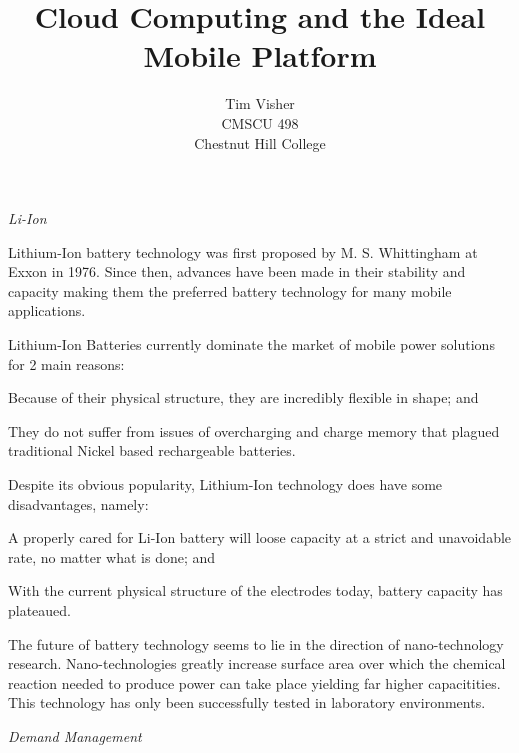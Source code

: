 \documentclass[letterpaper]{article}
\author{Tim Visher\\ CMSCU 498\\ Chestnut Hill College}
\title{Cloud Computing and the Ideal Mobile Platform}
\begin{document}
\Huge{

  \begin{center}
    \emph{Li-Ion}
  \end{center}}

\huge{

  Lithium-Ion battery technology was first proposed by M. S. Whittingham at
  Exxon in 1976.  Since then, advances have been made in their stability and
  capacity making them the preferred battery technology for many mobile
  applications.

  Lithium-Ion Batteries currently dominate the market of mobile power solutions
  for 2 main reasons:
  \begin{inparaenum}[(1)]
  \item Because of their physical structure, they are incredibly flexible in
    shape; and
  \item They do not suffer from issues of overcharging and charge memory that
    plagued traditional Nickel based rechargeable batteries.
  \end{inparaenum}

  Despite its obvious popularity, Lithium-Ion technology does have some
  disadvantages, namely:
  \begin{inparaenum}[(1)]
  \item A properly cared for Li-Ion battery will loose capacity at a strict and
    unavoidable rate, no matter what is done; and
  \item With the current physical structure of the electrodes today, battery
    capacity has plateaued.
  \end{inparaenum}

  The future of battery technology seems to lie in the direction of
  nano-technology research.  Nano-technologies greatly increase surface area
  over which the chemical reaction needed to produce power can take place
  yielding far higher capacitities.  This technology has only been successfully
  tested in laboratory environments.}


\newpage

\Huge{

  \begin{center}
    \emph{Demand Management}
  \end{center}}
\end{document}
